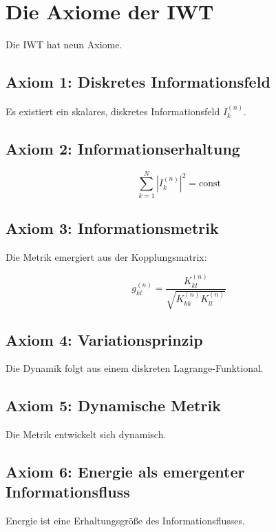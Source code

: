 
\section{Die Axiome der IWT}

Die IWT hat neun Axiome.

\subsection{Axiom 1: Diskretes Informationsfeld}

Es existiert ein skalares, diskretes Informationsfeld \( I_k^{(n)} \).

\subsection{Axiom 2: Informationserhaltung}

\[
\sum_{k=1}^{N} |I_k^{(n)}|^2 = \text{const}
\]

\subsection{Axiom 3: Informationsmetrik}

Die Metrik emergiert aus der Kopplungsmatrix:

\[
g_{kl}^{(n)} = \frac{K_{kl}^{(n)}}{\sqrt{K_{kk}^{(n)} K_{ll}^{(n)}}}
\]

\subsection{Axiom 4: Variationsprinzip}

Die Dynamik folgt aus einem diskreten Lagrange-Funktional.

\subsection{Axiom 5: Dynamische Metrik}

Die Metrik entwickelt sich dynamisch.

\subsection{Axiom 6: Energie als emergenter Informationsfluss}

Energie ist eine Erhaltungsgröße des Informationsflusses.


